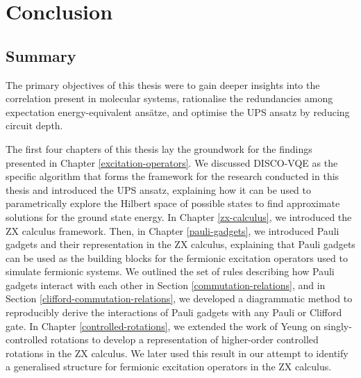 \chapter{Conclusion}%
\label{conclusion}

\section{Summary}

The primary objectives of this thesis were to gain deeper insights into the correlation present in molecular systems, rationalise the redundancies among expectation energy-equivalent ansätze, and optimise the UPS ansatz by reducing circuit depth.

The first four chapters of this thesis lay the groundwork for the findings presented in Chapter \ref{excitation-operators}. We discussed DISCO-VQE as the specific algorithm that forms the framework for the research conducted in this thesis and introduced the UPS ansatz, explaining how it can be used to parametrically explore the Hilbert space of possible states to find approximate solutions for the ground state energy. In Chapter \ref{zx-calculus}, we introduced the ZX calculus framework. Then, in Chapter \ref{pauli-gadgets}, we introduced Pauli gadgets and their representation in the ZX calculus, explaining that Pauli gadgets can be used as the building blocks for the fermionic excitation operators used to simulate fermionic systems. We outlined the set of rules describing how Pauli gadgets interact with each other in Section \ref{commutation-relations}, and in Section \ref{clifford-commutation-relations}, we developed a diagrammatic method to reproducibly derive the interactions of Pauli gadgets with any Pauli or Clifford gate. In Chapter \ref{controlled-rotations}, we extended the work of Yeung \cite{Yeung2020} on singly-controlled rotations to develop a representation of higher-order controlled rotations in the ZX calculus. We later used this result in our attempt to identify a generalised structure for fermionic excitation operators in the ZX calculus.

